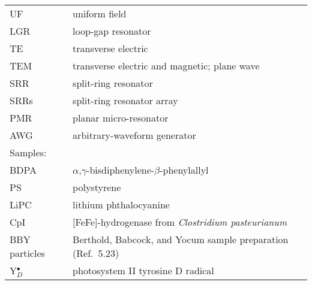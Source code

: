 \documentclass[11pt,a4paper,openany,twoside,english,titlepage=true]{scrbook}
\newcounter{Seitenzahl}%
\begin{document}
\begin{table}[ht]
\begin{tabular}{ll}
UF              & uniform field \\ 
LGR             & loop-gap resonator \\ 
TE              & transverse electric \\
TEM             & transverse electric and magnetic; plane wave \\
SRR             & split-ring resonator \\
SRRs            & split-ring resonator array \\
PMR             & planar micro-resonator \\ 
AWG             & arbitrary-waveform generator \\ \hline \hline
\rowcolor{LightCyan}
Samples:        & \\ \hline
BDPA            & $\alpha$,$\gamma$-bisdiphenylene-$\beta$-phenylallyl \\
PS              & polystyrene \\
LiPC            & lithium phthalocyanine \\
CpI             & [FeFe]-hydrogenase from \textit{Clostridium pasteurianum} \\
BBY particles   & Berthold, Babcock, and Yocum sample preparation (Ref.~5.23) $\qquad$\\
Y$_D^\bullet$   & photosystem II tyrosine D radical \\ \hline \hline
\end{tabular}\newpage
{}
\end{table}
\newpage


\cleardoublepage
\setcounter{Seitenzahl}{\value{page}}
\setcounter{page}{0}
\mainmatter









\begin{appendices}




%
\end{appendices}

\backmatter
{}
\end{document}
